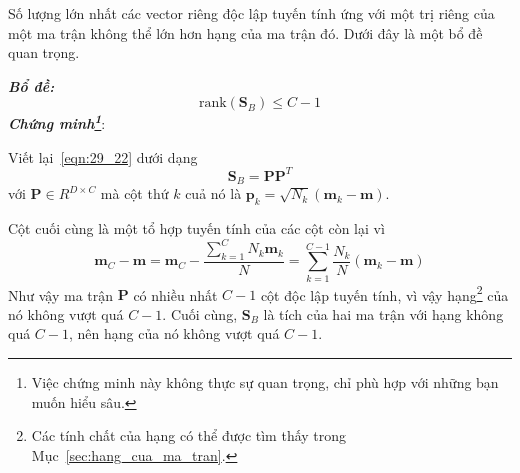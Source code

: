 Số lượng lớn nhất các vector riêng độc lập tuyến tính ứng với một trị riêng của
một ma trận không thể lớn hơn hạng của ma trận đó. Dưới đây là một bổ đề quan
trọng.
 
\textit{\textbf{Bổ đề:}}
\begin{equation} 
\text{rank}(\mathbf{S}_B) \leq C - 1 
\end{equation} 
\textit{\textbf{Chứng minh\footnote{Việc chứng minh này không thực sự quan trọng, chỉ
phù hợp với những bạn muốn hiểu sâu.}}}:
 
Viết lại~\ref{eqn:29_22} dưới dạng
\begin{equation} 
\mathbf{S}_B = \mathbf{P}\mathbf{P}^T 
\end{equation} 
với $\mathbf{P} \in {R}^{D \times C}$ mà cột thứ $k$ cuả nó là
\begin{math} 
\mathbf{p}_k = \sqrt{N_k} (\mathbf{m}_k - \mathbf{m}) 
\end{math}.
 
Cột cuối cùng là một tổ hợp tuyến tính của các cột còn lại vì
\begin{equation} 
\mathbf{m}_C - \mathbf{m} = \mathbf{m}_C - \frac{\sum_{k=1}^C N_k \mathbf{m}_k}{N} = \sum_{k=1}^{C-1} \frac{N_k}{N} (\mathbf{m}_k - \mathbf{m}) 
\end{equation} 
Như vậy ma trận $\mathbf{P}$ có nhiều nhất $C-1$ cột độc lập tuyến tính, vì vậy hạng\footnote{Các tính chất của hạng có thể được tìm thấy trong
Mục~\ref{sec:hang_cua_ma_tran}.} của nó không vượt quá $C -1$. Cuối cùng,
$\mathbf{S}_B$ là tích của hai ma trận với hạng không quá $C-1$, nên
hạng của nó không vượt quá $C-1$. \dpcm
 

 
 
 
